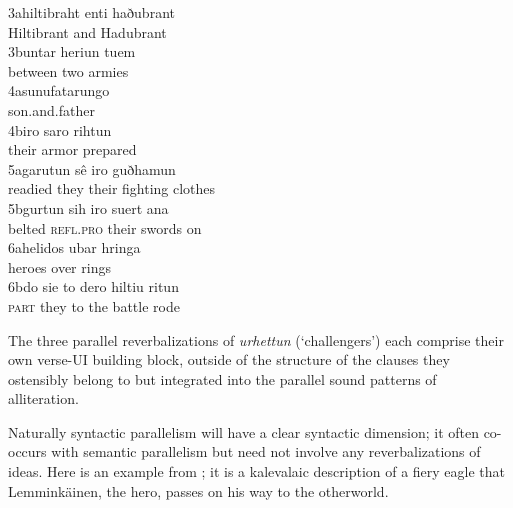 3a\tab \gll hiltibraht  enti    haðubrant\\
            Hiltibrant   and    Hadubrant\\

3b\tab \gll untar     heriun  tuem\\
            between   two     armies\\

4a\tab \gll sunufatarungo\\
            son.and.father\\

4b\tab \gll iro    saro   rihtun\\
            their   armor  prepared\\

5a\tab \gll garutun  sê    iro     guðhamun\\
            readied  they    their   {fighting clothes}\\

5b\tab \gll gurtun  sih        iro     suert  ana\\
            belted   \textsc{refl.pro}  their  swords   on\\

6a\tab \gll helidos   ubar  hringa\\
            heroes  over   rings\\

6b\tab \gll do     sie    to  dero   hiltiu  ritun\\
            \textsc{part}  they   to  the    battle  rode\\
  \z

\noindent The three parallel reverbalizations of \textit{urhettun} (‘challengers’) each comprise their own verse-UI building block, outside of the structure of the clauses they ostensibly belong to but integrated into the parallel sound patterns of alliteration.

Naturally syntactic parallelism will have a clear syntactic dimension; it often co-occurs with semantic parallelism but need not involve any reverbalizations of ideas. Here is an example from \citet[448]{Frog2017}; it is a kalevalaic description of a fiery eagle that Lemminkäinen, the hero, passes on his way to the otherworld.

